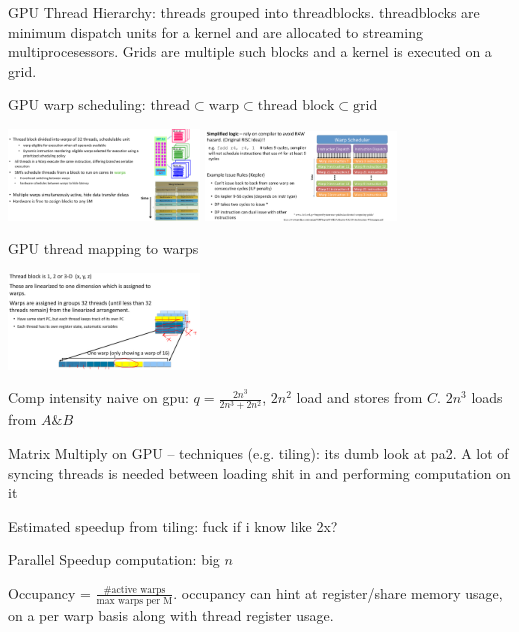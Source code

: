 \documentclass[letter,8pt,landscape]{article}
\begin{document}
\begin{multicols}{3}
  GPU Thread Hierarchy: threads grouped into threadblocks. threadblocks are
  minimum dispatch units for a kernel and are allocated to streaming
  multiprocesessors. Grids are multiple such blocks and a kernel is executed on
  a grid. 

  GPU warp scheduling: $\text{thread} \subset \text{warp} \subset\text{thread block} \subset\text{grid}$

  \begin{center}
    \includegraphics[width=2in]{images/warp-scheduling.jpg}
    \includegraphics[width=2in]{images/warp-scheduling2.jpg}
  \end{center}

  GPU thread mapping to warps
  \begin{center}
    \includegraphics[width=2in]{images/thread-mapping-warp.jpg}
  \end{center}

  Comp intensity naive on gpu: $q = \frac{2n^3}{2n^3 + 2n^2}$, $2n^2$ load and
  stores from $C$. $2n^3$ loads from $A\&B$

  Matrix Multiply on GPU – techniques (e.g. tiling): its dumb look at pa2. A lot of syncing threads is needed between loading shit in and performing
  computation on it

  Estimated speedup from tiling: fuck if i know like 2x?

  Parallel Speedup computation: big $n$

  Occupancy = $\frac{\text{\# active warps}}{\text{max warps per M}}$.
  occupancy can hint at register/share memory usage, on a per warp basis along
  with thread register usage.


\end{multicols}
\end{document}
